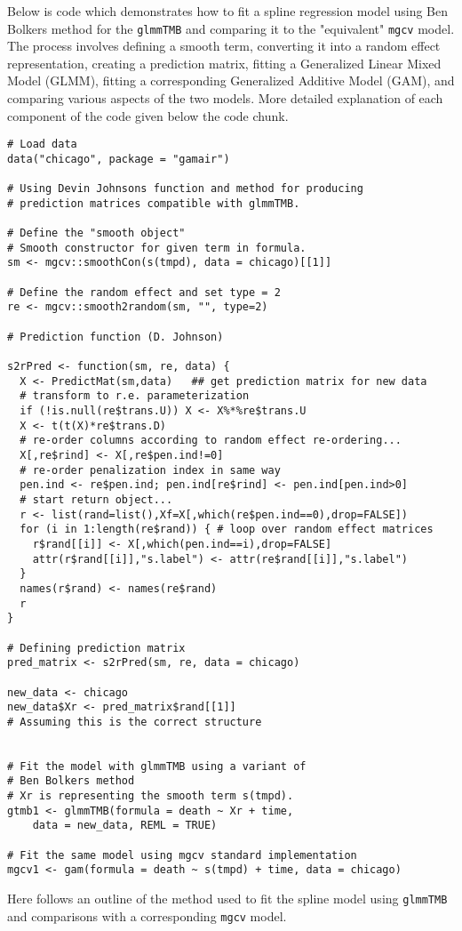 Below is code which demonstrates how to fit a spline regression model using Ben Bolkers method for the \texttt{glmmTMB} and comparing it to the "equivalent" \texttt{mgcv} model. The process involves defining a smooth term, converting it into a random effect representation, creating a prediction matrix, fitting a Generalized Linear Mixed Model (GLMM), fitting a corresponding Generalized Additive Model (GAM), and comparing various aspects of the two models. More detailed explanation of each component of the code given below the code chunk. 

\begin{verbatim}
# Load data
data("chicago", package = "gamair")

# Using Devin Johnsons function and method for producing
# prediction matrices compatible with glmmTMB.

# Define the "smooth object"
# Smooth constructor for given term in formula. 
sm <- mgcv::smoothCon(s(tmpd), data = chicago)[[1]] 

# Define the random effect and set type = 2
re <- mgcv::smooth2random(sm, "", type=2)

# Prediction function (D. Johnson)
 
s2rPred <- function(sm, re, data) {
  X <- PredictMat(sm,data)   ## get prediction matrix for new data
  # transform to r.e. parameterization
  if (!is.null(re$trans.U)) X <- X%*%re$trans.U
  X <- t(t(X)*re$trans.D)
  # re-order columns according to random effect re-ordering...
  X[,re$rind] <- X[,re$pen.ind!=0] 
  # re-order penalization index in same way  
  pen.ind <- re$pen.ind; pen.ind[re$rind] <- pen.ind[pen.ind>0]
  # start return object...
  r <- list(rand=list(),Xf=X[,which(re$pen.ind==0),drop=FALSE])
  for (i in 1:length(re$rand)) { # loop over random effect matrices
    r$rand[[i]] <- X[,which(pen.ind==i),drop=FALSE]
    attr(r$rand[[i]],"s.label") <- attr(re$rand[[i]],"s.label")
  } 
  names(r$rand) <- names(re$rand)
  r
}

# Defining prediction matrix
pred_matrix <- s2rPred(sm, re, data = chicago)

new_data <- chicago
new_data$Xr <- pred_matrix$rand[[1]] 
# Assuming this is the correct structure


# Fit the model with glmmTMB using a variant of
# Ben Bolkers method
# Xr is representing the smooth term s(tmpd).
gtmb1 <- glmmTMB(formula = death ~ Xr + time, 
    data = new_data, REML = TRUE)

# Fit the same model using mgcv standard implementation
mgcv1 <- gam(formula = death ~ s(tmpd) + time, data = chicago)
\end{verbatim}
Here follows an outline of the method used to fit the spline model using \texttt{glmmTMB} and comparisons with a corresponding \texttt{mgcv} model.
\newline

